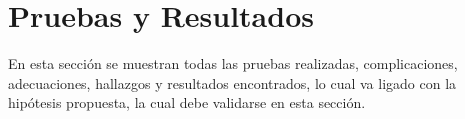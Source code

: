 \chapter{Pruebas y Resultados}\label{Cap_03}
\lettrine[lines=2,nindent=0pt]{E}{}n esta sección se muestran todas las pruebas realizadas, complicaciones, adecuaciones, hallazgos y resultados encontrados, lo cual va ligado con la hipótesis propuesta, la cual debe validarse en esta sección.